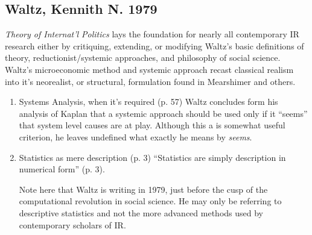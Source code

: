 \documentclass[11pt]{article}
\begin{document}
\subsection{Waltz, Kennith N. 1979}
\label{sec-2-7}
\emph{Theory of Internat'l Politics} lays the foundation for nearly
all contemporary IR research either by critiquing, extending, or
modifying Waltz's basic definitions of theory, reductionist/systemic
approaches, and philosophy of social science. Waltz's microeconomic
method and systemic approach recast classical realism into it's
neorealist, or structural, formulation found in Mearshimer and others.
\begin{enumerate}
\item Systems Analysis, when it's required (p. 57)
\label{sec-2-7-1}
Waltz concludes form his analysis of Kaplan that a systemic approach
should be used only if it ``seems'' that system level causes are at
play. Although this a is somewhat useful criterion, he leaves
undefined what exactly he means by \emph{seems}.
\item Statistics as mere description (p. 3)
\label{sec-2-7-2}
``Statistics are simply description in numerical form'' (p. 3). 

Note here that Waltz is writing in 1979, just before the cusp of the
computational revolution in social science. He may only be referring
to descriptive statistics and not the more advanced methods used by
contemporary scholars of IR.
\end{enumerate}
\end{document}
